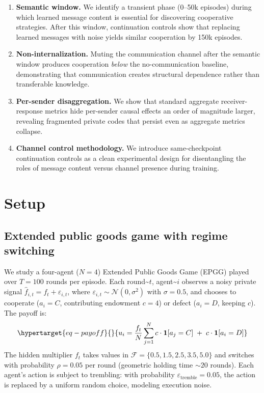 \documentclass[
  10pt,
  letterpaper,
]{article}
\newcommand{\fhat}{\hat{f}}
\begin{document}
\begin{enumerate}[leftmargin=*,nosep]
  \item \textbf{Semantic window.} We identify a transient phase (0--50k episodes) during which learned message content is essential for discovering cooperative strategies. After this window, continuation controls show that replacing learned messages with noise yields similar cooperation by 150k episodes.
  \item \textbf{Non-internalization.} Muting the communication channel after the semantic window produces cooperation \emph{below} the no-communication baseline, demonstrating that communication creates structural dependence rather than transferable knowledge.
  \item \textbf{Per-sender disaggregation.} We show that standard aggregate receiver-response metrics hide per-sender causal effects an order of magnitude larger, revealing fragmented private codes that persist even as aggregate metrics collapse.
  \item \textbf{Channel control methodology.} We introduce same-checkpoint continuation controls as a clean experimental design for disentangling the roles of message content versus channel presence during training.
\end{enumerate}

\hypertarget{sec-setup}{%
\section{Setup}\label{sec-setup}}

\hypertarget{extended-public-goods-game-with-regime-switching}{%
\subsection{Extended public goods game with regime
switching}\label{extended-public-goods-game-with-regime-switching}}

We study a four-agent (\(N=4\)) Extended Public Goods Game (EPGG) played
over \(T=100\) rounds per episode. Each round\textasciitilde{}\(t\),
agent\textasciitilde{}\(i\) observes a noisy private signal
\(\fhat_{i,t} = f_t + \varepsilon_{i,t}\), where
\(\varepsilon_{i,t} \sim \mathcal{N}(0, \sigma^2)\) with
\(\sigma = 0.5\), and chooses to cooperate (\(a_i = C\), contributing
endowment \(c=4\)) or defect (\(a_i = D\), keeping \(c\)). The payoff
is: \begin{equation}\protect\hypertarget{eq-payoff}{}{
  u_i = \frac{f_t}{N} \sum_{j=1}^{N} c \cdot \mathbf{1}[a_j = C] \;+\; c \cdot \mathbf{1}[a_i = D]
}\label{eq-payoff}\end{equation} The hidden multiplier \(f_t\) takes
values in \(\mathcal{F} = \{0.5, 1.5, 2.5, 3.5, 5.0\}\) and switches
with probability \(\rho = 0.05\) per round (geometric holding time
\({\sim}20\) rounds). Each agent's action is subject to trembling: with
probability \(\varepsilon_{\text{tremble}} = 0.05\), the action is
replaced by a uniform random choice, modeling execution noise.
\end{document}
